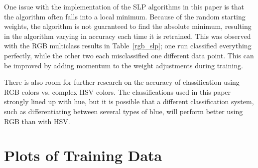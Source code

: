 \documentclass[twoside]{IEEEtran}
\begin{document}
One issue with the implementation of the SLP algorithms in this paper is that the algorithm often
falls into a local minimum. Because of the random starting weights, the algorithm is not
guaranteed to find the absolute minimum, resulting in the algorithm varying in accuracy each
time it is retrained. This was observed with the RGB multiclass results in Table~\ref{rgb_slp}; one run
classified everything perfectly, while the other two each misclassified one different data point.
This can be improved by adding momentum to the weight adjustments during training.

There is also room for further research on the accuracy of classification using RGB colors vs.
complex HSV colors. The classifications used in this paper strongly lined up with hue, but it is
possible that a different classification system, such as differentiating between several types of
blue, will perform better using RGB than with HSV.\@

\appendices%

\section{Plots of Training Data}%
\label{train_data_plots}
\end{document}
